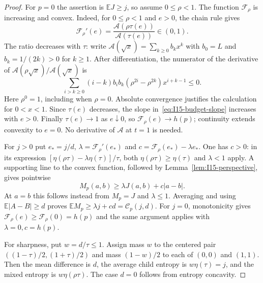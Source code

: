 \documentclass[11pt]{article}
\theoremstyle{remark}\newtheorem{remark}[theorem]{Remark}
\newcommand{\E}{\mathbb E}\newcommand{\PP}{\mathbb P}\newcommand{\dd}{\,\mathrm d}
\numberwithin{equation}{section}
\begin{document}
\begin{proof}
For $p=0$ the assertion is $\E J\ge j$, so assume $0\le\rho<1$.
The function $\mathcal F_\rho$ is increasing and convex. Indeed, for $0\le\rho<1$
and $e>0$, the chain rule gives
\begin{equation}\label{eq:I15-budget-slope}
 \mathcal F_\rho'(e)=\frac{\mathscr A(\rho\tau(e))}{\mathscr A(\tau(e))}
                  \in(0,1).
\end{equation}
The ratio decreases with $\tau$: write
$\mathscr A(\sqrt x)=\sum_{k\ge0}b_kx^k$ with
$b_0=L$ and $b_k=1/(2k)>0$ for $k\ge1$.
After differentiation, the numerator of the derivative of
$\mathscr A(\rho\sqrt x)/\mathscr A(\sqrt x)$ is
\[
 \sum_{i>k\ge0}(i-k)b_i b_k(\rho^{2i}-\rho^{2k})x^{i+k-1}\le0.
\]
Here $\rho^0=1$, including when $\rho=0$.
Absolute convergence justifies the calculation for $0<x<1$.
Since $\tau(e)$ decreases, the slope in~\eqref{eq:I15-budget-slope}
increases with $e>0$. Finally $\tau(e)\to1$ as $e\downarrow0$,
so $\mathcal F_\rho(e)\to h(p)$; continuity extends convexity to $e=0$.
No derivative of $\mathscr A$ at $t=1$ is needed.

For $j>0$ put $e_*=j/d$, $\lambda=\mathcal F_\rho'(e_*)$ and
$c=\mathcal F_\rho(e_*)-\lambda e_*$.
One has $c>0$: in its expression
$[\eta(\rho\tau)-\lambda\eta(\tau)]/\tau$, both
$\eta(\rho\tau)\ge\eta(\tau)$ and $\lambda<1$ apply.
A supporting line to the convex function, followed by Lemma~\ref{lem:I15-perspective},
gives pointwise
\[
 M_p(a,b)\ge\lambda J(a,b)+c|a-b|.
\]
At $a=b$ this follows instead from $M_p=J$ and $\lambda\le1$.
Averaging and using $\E|A-B|\ge d$ proves
$\E M_p\ge\lambda j+cd=\mathcal C_p(j,d)$.
For $j=0$, monotonicity gives $\mathcal F_\rho(e)\ge\mathcal F_\rho(0)=h(p)$
and the same argument applies with $\lambda=0,c=h(p)$.

For sharpness, put $w=d/\tau\le1$. Assign mass $w$ to the centered pair
$((1-\tau)/2,(1+\tau)/2)$ and mass $(1-w)/2$ to each of $(0,0)$ and $(1,1)$.
Then the mean difference is $d$, the average child entropy is
$w\eta(\tau)=j$, and the mixed entropy is $w\eta(\rho\tau)$.
The case $d=0$ follows from entropy concavity.
\end{proof}
\end{document}
